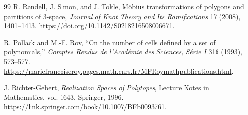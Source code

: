 \documentclass[11pt]{article}
\theoremstyle{remark}
\theoremstyle{plain}
\begin{document}
\begin{thebibliography}{99}
R. Randell, J. Simon, and J. Tokle,
M\"obius transformations of polygons and partitions of \(3\)-space,
\emph{Journal of Knot Theory and Its Ramifications} 17 (2008), 1401--1413.
\url{https://doi.org/10.1142/S0218216508006671}.

R. Pollack and M.-F. Roy,
``On the number of cells defined by a set of polynomials,''
\emph{Comptes Rendus de l'Acad\'emie des Sciences, S\'erie I} 316 (1993),
573--577.
\url{https://mariefrancoiseroy.pages.math.cnrs.fr/MFRoymathpublications.html}.

J. Richter-Gebert,
\emph{Realization Spaces of Polytopes},
Lecture Notes in Mathematics, vol. 1643, Springer, 1996.
\url{https://link.springer.com/book/10.1007/BFb0093761}.

\end{thebibliography}
\end{document}
